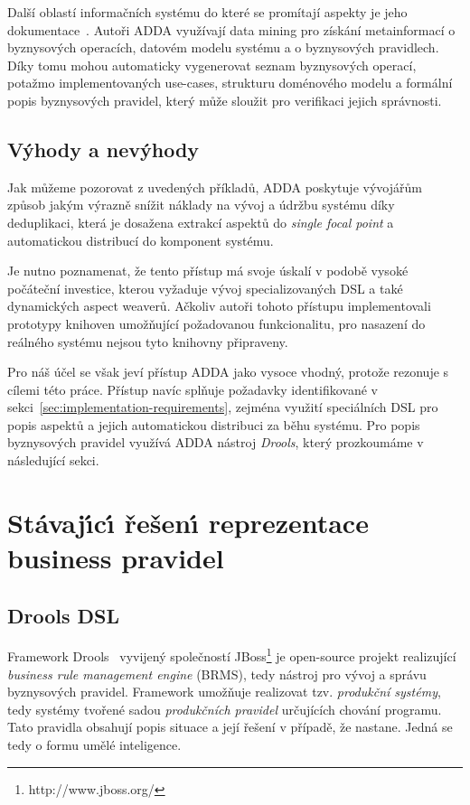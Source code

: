 Další oblastí informačních systému do které se promítají aspekty
je jeho dokumentace~\cite{cemus2017automated}. Autoři \gls{ADDA}
využívají data mining pro získání metainformací o byznysových operacích,
datovém modelu systému a o byznysových pravidlech. Díky tomu mohou
automaticky vygenerovat seznam byznysových operací, potažmo implementovaných
use-cases, strukturu doménového modelu a formální popis byznysových pravidel,
který může sloužit pro verifikaci jejich správnosti.

\subsection{Výhody a nevýhody}

Jak můžeme pozorovat z uvedených příkladů, \gls{ADDA} poskytuje
vývojářům způsob jakým výrazně snížit náklady na vývoj a údržbu
systému díky deduplikaci, která je dosažena extrakcí aspektů
do \textit{single focal point} a automatickou distribucí do
komponent systému.

Je nutno poznamenat, že tento přístup má svoje úskalí v podobě
vysoké počáteční investice, kterou vyžaduje vývoj specializovaných
\gls{DSL} a také dynamických aspect weaverů. Ačkoliv autoři
tohoto přístupu implementovali prototypy knihoven umožňující
požadovanou funkcionalitu, pro nasazení do reálného systému
nejsou tyto knihovny připraveny.

Pro náš účel se však jeví přístup \gls{ADDA} jako vysoce vhodný, protože
rezonuje s cílemi této práce. Přístup navíc splňuje požadavky
identifikované v sekci~\ref{sec:implementation-requirements},
zejména využití speciálních \gls{DSL} pro popis aspektů a
jejich automatickou distribuci za běhu systému. Pro popis byznysových pravidel
využívá \gls{ADDA} nástroj \textit{Drools}, který prozkoumáme v následující sekci.

\section{Stávaj\'{\i}c\'{\i} řešen\'{\i} reprezentace business pravidel}

\subsection{Drools DSL}

Framework Drools~\cite{drools} vyvijený společností JBoss\footnote{http://www.jboss.org/}
je open-source projekt realizující \textit{business rule management engine} (\gls{BRMS}),
tedy nástroj pro vývoj a správu byznysových pravidel. Framework umožňuje realizovat
tzv. \textit{produkční systémy}, tedy systémy tvořené sadou \textit{produkčních pravidel}
určujících chování programu. Tato pravidla obsahují popis situace a její řešení v případě,
že nastane. Jedná se tedy o formu umělé inteligence.

